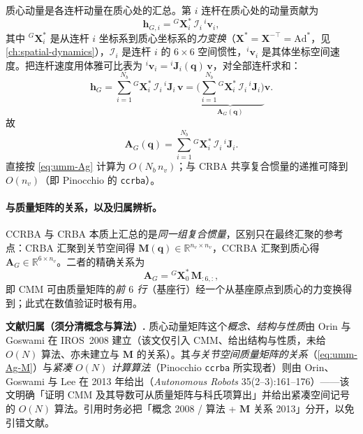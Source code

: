 \begin{derivation}
质心动量是各连杆动量在质心处的汇总。第 $i$ 连杆在质心处的动量贡献为
\begin{equation}
  \mathbf h_{G,i}={}^G\mathbf X_i^*\,\mathcal I_i\,{}^i\mathbf v_i,
  \label{eq:umm-ccrba-body}
\end{equation}
其中 ${}^G\mathbf X_i^*$ 是从连杆 $i$ 坐标系到质心坐标系的\emph{力变换}（$\mathbf X^*=\mathbf X^{-\top}=\mathrm{Ad}^*$，见 \cref{ch:spatial-dynamics}），$\mathcal I_i$ 是连杆 $i$ 的 $6\times6$ 空间惯性，${}^i\mathbf v_i$ 是其体坐标空间速度。把连杆速度用体雅可比表为 ${}^i\mathbf v_i={}^i\mathbf J_i(\mathbf q)\,\mathbf v$，对全部连杆求和：
\begin{equation}
  \mathbf h_G=\sum_{i=1}^{N_b}{}^G\mathbf X_i^*\,\mathcal I_i\,{}^i\mathbf J_i\,\mathbf v
  =\underbrace{\Big(\sum_{i=1}^{N_b}{}^G\mathbf X_i^*\,\mathcal I_i\,{}^i\mathbf J_i\Big)}_{\mathbf A_G(\mathbf q)}\mathbf v.
  \label{eq:umm-ccrba-sum}
\end{equation}
故
\begin{equation}
  \mathbf A_G(\mathbf q)=\sum_{i=1}^{N_b}{}^G\mathbf X_i^*\,\mathcal I_i\,{}^i\mathbf J_i.
  \label{eq:umm-Ag}
\end{equation}
直接按 \cref{eq:umm-Ag} 计算为 $O(N_b\,n_v)$；与 CRBA 共享复合惯量的递推可降到 $O(n_v)$（即 Pinocchio 的 \texttt{ccrba}）。
\end{derivation}

\paragraph{与质量矩阵的关系，以及归属辨析。}
CCRBA 与 CRBA 本质上汇总的是\emph{同一组复合惯量}，区别只在最终汇聚的参考点：CRBA 汇聚到关节空间得 $\mathbf M(\mathbf q)\in\mathbb R^{n_v\times n_v}$，CCRBA 汇聚到质心得 $\mathbf A_G\in\mathbb R^{6\times n_v}$。二者的精确关系为
\begin{equation}
  \mathbf A_G={}^G\mathbf X_0^*\,\mathbf M_{:6,:},
  \label{eq:umm-Ag-M}
\end{equation}
即 CMM 可由质量矩阵的\emph{前 $6$ 行}（基座行）经一个从基座原点到质心的力变换得到；此式在数值验证时极有用。

\begin{note}
\textbf{文献归属（须分清概念与算法）.}\;
质心动量矩阵这个\emph{概念、结构与性质}由 Orin 与 Goswami 在 IROS~2008 建立\cite{orin2008centroidal}（该文仅引入 CMM、给出结构与性质，未给 $O(N)$ 算法、亦未建立与 $\mathbf M$ 的关系）。其\emph{与关节空间质量矩阵的关系}（\cref{eq:umm-Ag-M}）与\emph{紧凑 $O(N)$ 计算算法}（Pinocchio \texttt{ccrba} 所实现者）则由 Orin、Goswami 与 Lee 在 2013 年给出\cite{orin2013centroidal}（\emph{Autonomous Robots} 35(2--3):161--176）——该文明确「证明 CMM 及其导数可从质量矩阵与科氏项算出」并给出紧凑空间记号的 $O(N)$ 算法。引用时务必把「概念 2008 / 算法 + $\mathbf M$ 关系 2013」分开，以免引错文献。
\end{note}

